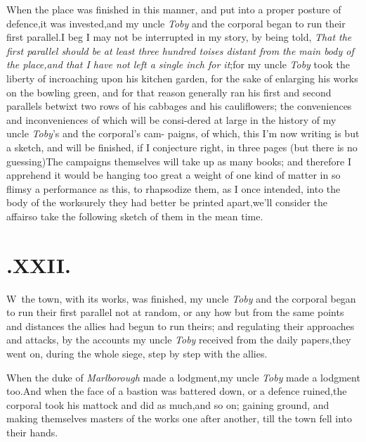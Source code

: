 \documentclass{article}
\begin{document}
When the place was finished in this 
manner, and put into a proper posture
of defence,\tsk it was invested,\tsk and my\break
uncle \textit{Toby} and the corporal began to run\break
their first parallel.\tsk I beg I may not\break
be interrupted in my story, by being\break
told, \textit{That the first parallel should be at least three
hundred toises distant from the main body of the place,\tsk and
that I have not left a single inch for it};\tsh for my
uncle \textit{Toby} took the liberty of incroaching upon his
kitchen garden, for the sake of enlarging his works on the
bowling green, and for that reason generally ran his first and
second parallels betwixt two rows of his cabbages and his
cauliflowers; the conveniences and inconveniences of which will be
consi-\pb dered at large in the history of my\break
uncle \textit{Toby}’s and the corporal’s cam-\break
paigns, of which,
this I’m now writing is but a sketch, and will be finished,
if\break
I conjecture right, in three pages (but there is no
guessing)\tsh The campaigns themselves will take up as
many books; and therefore I apprehend it would be hanging too great
a weight of one kind of matter in so flimsy a performance as this,
to rhapsodize them, as I once intended, into the body of the
work\tsh surely they had better be printed
apart,\break\tsh we’ll consider the affair\tsh so
take the following sketch of them in the mean time.

\enlargethispage\baselineskip

\section{.\enspace XXII.}

\lettrine{W}{\,} the town, with its works,\break
was finished, my uncle \textit{Toby}\break
and the corporal began to run their first\pb
parallel \tsh not at random, or any how\break
\tsh but from the same points and
distances the allies had begun to run theirs; and regulating
their approaches and attacks, by the accounts my uncle
\textit{Toby} received from the daily papers,\tsk they went on,
during the whole siege, step by step with the allies.

When the duke of \textit{Marlborough} made a
lodgment,\tsh my uncle \textit{Toby} made a lodgment
too.\tsh And when the face of a bastion was battered down,
or a defence ruined,\tsk the corporal took his mattock and did as
much,\tsk and so on;\break
\tsh gaining ground, and making
themselves masters of the works one after another, till the town
fell into their\break
hands.
\end{document}
